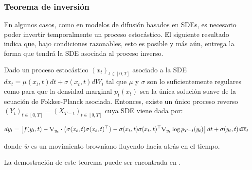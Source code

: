 \subsubsection{Teorema de inversión}

En algunos casos, como en modelos de difusión basados en SDEs, es necesario poder invertir temporalmente un proceso estocástico. El siguiente resultado indica que, bajo condiciones razonables, esto es posible y más aún, entrega la forma que tendrá la SDE asociada al proceso inverso.

\begin{teo}
    \label{teo:anderson}
    Dado un proceso estocástico $(x_t)_{t\in[0,T]}$ asociado a la SDE $dx_t=\mu(x_t,t)dt+\sigma(x_t,t)dW_t$ tal que $\mu$ y $\sigma$ son lo suficientemente regulares como para que la densidad marginal $p_t(x_t)$ sea la única solución suave de la ecuación de Fokker-Planck asociada. Entonces, existe un único proceso reverso $(Y_t)_{t\in[0,T]}=(X_{T-t})_{t\in[0,T]}$ cuya SDE viene dada por:

    \begin{equation*}
        dy_t = \left[f(y_t,t) - \nabla_{y_t}\cdot\left(\sigma(x_t,t)\sigma(x_t,t)^\top\right) - \sigma(x_t,t)\sigma(x_t,t)^\top \nabla_{y_t} \log p_{T-t}(y_t)\right]dt + \sigma(y_t,t)d\overline{w}_t
    \end{equation*}

    donde $\overline{w}$ es un movimiento browniano fluyendo hacia atrás en el tiempo.
\end{teo}

La demostración de este teorema puede ser encontrada en \cite{anderson1982reverse}.





